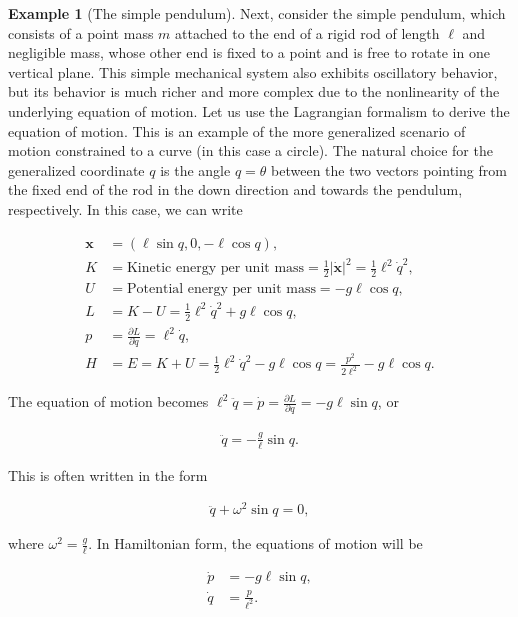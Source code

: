 \documentclass[11pt]{report}
\theoremstyle{plain}
\theoremstyle{definition}
\newtheorem{example}[thm]{Example}
\begin{document}
\begin{example}[The simple pendulum]
Next, consider the simple pendulum, which consists of
a point mass $m$ attached to the end of a rigid rod
of length $\ell$ and negligible mass, whose other end
is fixed to a point and is free to rotate in one
vertical plane. This simple mechanical system also
exhibits oscillatory behavior, but its behavior is
much richer and more complex due to the nonlinearity
of the underlying equation of motion. Let us use the
Lagrangian formalism to derive the equation of motion.
This is an example of the more generalized scenario of
motion constrained to a curve (in this case a circle).
The natural choice for the generalized coordinate $q$
is the angle $q=\theta$ between the two vectors
pointing from the fixed end of the rod in the down
direction and towards the pendulum, respectively. In
this case, we can write

\begin{align*}
\mathbf{x} &= (\ell\sin q, 0, -\ell \cos q), \\
K &= \textrm{Kinetic energy per unit mass} = \tfrac12|\dot{\mathbf{x}}|^2 = \tfrac12 \ell^2 \dot{q}^2, \\
U &= \textrm{Potential energy per unit mass} = -g\ell\cos q, \\
L &= K-U = \tfrac12 \ell^2 \dot{q}^2 + g \ell \cos q, \\
p &= \frac{\partial L}{\partial \dot{q}} = \ell^2 \dot{q}, \\
H &= E = K+U = \tfrac12 \ell^2 \dot{q}^2 - g \ell\cos q
= \frac{p^2}{2\ell^2} - g\ell\cos q.
\end{align*}

The equation of motion becomes
$\ell^2 \ddot{q}=\dot{p} = \frac{\partial L}{\partial
q}=-g\ell \sin q$,
or

\begin{align*}
\ddot{q} = -\frac{g}{\ell} \sin q.
\end{align*}

This is often written in the form

\begin{equation*} \tag{12}\label{eq:pendulumeq}
\begin{split}
\ddot{q} + \omega^2 \sin q = 0,
\end{split}
\end{equation*}

where $\omega^2 = \frac{g}{\ell}$. In Hamiltonian
form, the equations of motion will be

\begin{align*}
\dot{p}&= -g\ell \sin q, \\ \dot{q}&=\frac{p}{\ell^2}.
\end{align*}

\end{example}
\end{document}
